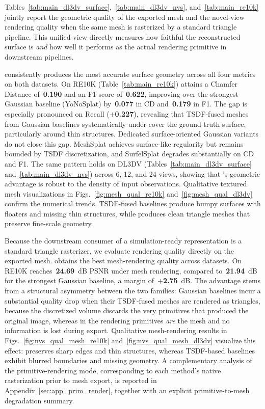Tables~\ref{tab:main_dl3dv_surface},~\ref{tab:main_dl3dv_nvs}, and~\ref{tab:main_re10k} jointly report the geometric quality of the exported mesh and the novel-view rendering quality when the same mesh is rasterized by a standard triangle pipeline. This unified view directly measures how faithful the reconstructed surface is \emph{and} how well it performs as the actual rendering primitive in downstream pipelines.

\method consistently produces the most accurate surface geometry across all four metrics on both datasets. On RE10K (Table~\ref{tab:main_re10k}) \method attains a Chamfer Distance of~\textbf{0.190} and an F1 score of~\textbf{0.622}, improving over the strongest Gaussian baseline (YoNoSplat) by~\textbf{0.077} in CD and~\textbf{0.179} in F1. The gap is especially pronounced on Recall ($+$\textbf{0.227}), revealing that TSDF-fused meshes from Gaussian baselines systematically under-cover the ground-truth surface, particularly around thin structures. Dedicated surface-oriented Gaussian variants do not close this gap. MeshSplat achieves surface-like regularity but remains bounded by TSDF discretization, and SurfelSplat degrades substantially on CD and F1. The same pattern holds on DL3DV (Tables~\ref{tab:main_dl3dv_surface} and~\ref{tab:main_dl3dv_nvs}) across 6, 12, and 24 views, showing that \method's geometric advantage is robust to the density of input observations. Qualitative textured mesh visualizations in Figs.~\ref{fig:mesh_qual_re10k} and~\ref{fig:mesh_qual_dl3dv} confirm the numerical trends. TSDF-fused baselines produce bumpy surfaces with floaters and missing thin structures, while \method produces clean triangle meshes that preserve fine-scale geometry.

Because the downstream consumer of a simulation-ready representation is a standard triangle rasterizer, we evaluate rendering quality directly on the exported mesh. \method obtains the best mesh-rendering quality across datasets. On RE10K \method reaches~\textbf{24.69}~dB PSNR under mesh rendering, compared to~\textbf{21.94}~dB for the strongest Gaussian baseline, a margin of~$+$\textbf{2.75}~dB. The advantage stems from a structural asymmetry between the two families: Gaussian baselines incur a substantial quality drop when their TSDF-fused meshes are rendered as triangles, because the discretized volume discards the very primitives that produced the original image, whereas in \method the rendering primitives \emph{are} the mesh and no information is lost during export. Qualitative mesh-rendering results in Figs.~\ref{fig:nvs_qual_mesh_re10k} and~\ref{fig:nvs_qual_mesh_dl3dv} visualize this effect: \method preserves sharp edges and thin structures, whereas TSDF-based baselines exhibit blurred boundaries and missing geometry. A complementary analysis of the primitive-rendering mode, corresponding to each method's native rasterization prior to mesh export, is reported in Appendix~\ref{sec:app_prim_render}, together with an explicit primitive-to-mesh degradation summary.

